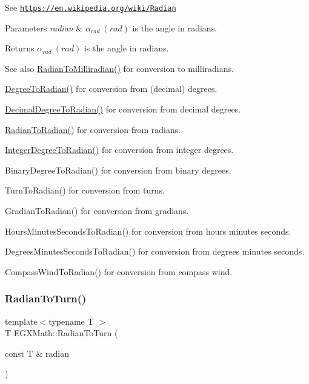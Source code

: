 See \href{https://en.wikipedia.org/wiki/Radian}{\tt https\+://en.\+wikipedia.\+org/wiki/\+Radian} 
\begin{DoxyParams}{Parameters}
{\em radian} & $\alpha_{rad}\ (rad)$ is the angle in radians. \\
\hline
\end{DoxyParams}
\begin{DoxyReturn}{Returns}
$\alpha_{rad}\ (rad)$ is the angle in radians. 
\end{DoxyReturn}
\begin{DoxySeeAlso}{See also}
\mbox{\hyperlink{group___e_g_x_math-_angle_conversions-_radian_gaea391f0cca39b05e298dd1cae162e7f1}{Radian\+To\+Milliradian()}} for conversion to milliradians. 

\mbox{\hyperlink{group___e_g_x_math-_angle_conversions-_degree_ga48585541b228c852c9d08a9eac3682f0}{Degree\+To\+Radian()}} for conversion from (decimal) degrees. 

\mbox{\hyperlink{group___e_g_x_math-_angle_conversions-_decimal_degree_ga906ee2c83cdf4caa59eb613dc2d5d52a}{Decimal\+Degree\+To\+Radian()}} for conversion from decimal degrees. 

\mbox{\hyperlink{group___e_g_x_math-_angle_conversions-_radian_gae08681bd86b8e7e4325f6c8cb3a0dc37}{Radian\+To\+Radian()}} for conversion from radians. 

\mbox{\hyperlink{group___e_g_x_math-_angle_conversions-_integer_degree_ga05d3368b00ea27b9895de2ffe5c8df38}{Integer\+Degree\+To\+Radian()}} for conversion from integer degrees. 

Binary\+Degree\+To\+Radian() for conversion from binary degrees. 

Turn\+To\+Radian() for conversion from turns. 

Gradian\+To\+Radian() for conversion from gradians. 

Hours\+Minutes\+Seconds\+To\+Radian() for conversion from hours minutes seconds. 

Degrees\+Minutes\+Seconds\+To\+Radian() for conversion from degrees minutes seconds. 

Compass\+Wind\+To\+Radian() for conversion from compass wind. 
\end{DoxySeeAlso}
\mbox{\label{group___e_g_x_math-_angle_conversions-_radian_ga8492d6d2f6467c619b65e5fb75a9ae04}} 
\subsubsection{\texorpdfstring{Radian\+To\+Turn()}{RadianToTurn()}}
{\footnotesize\ttfamily template$<$typename T $>$ \\
T E\+G\+X\+Math\+::\+Radian\+To\+Turn (\begin{DoxyParamCaption}\item[{const T \&}]{radian }\end{DoxyParamCaption})}



